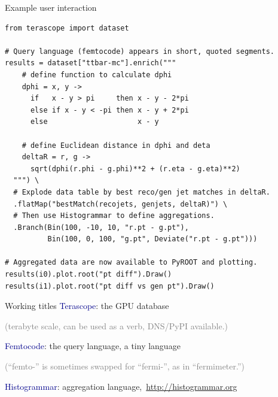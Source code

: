 \documentclass{beamer}
\begin{document}
\begin{frame}[fragile]{Example user interaction}
\vspace{0.25 cm}
\scriptsize
\begin{verbatim}
from terascope import dataset

# Query language (femtocode) appears in short, quoted segments.
results = dataset["ttbar-mc"].enrich("""
    # define function to calculate dphi
    dphi = x, y ->
      if   x - y > pi     then x - y - 2*pi
      else if x - y < -pi then x - y + 2*pi
      else                     x - y

    # define Euclidean distance in dphi and deta
    deltaR = r, g ->
      sqrt(dphi(r.phi - g.phi)**2 + (r.eta - g.eta)**2)
  """) \
  # Explode data table by best reco/gen jet matches in deltaR.
  .flatMap("bestMatch(recojets, genjets, deltaR)") \
  # Then use Histogrammar to define aggregations.
  .Branch(Bin(100, -10, 10, "r.pt - g.pt"),
          Bin(100, 0, 100, "g.pt", Deviate("r.pt - g.pt")))

# Aggregated data are now available to PyROOT and plotting.
results(i0).plot.root("pt diff").Draw()
results(i1).plot.root("pt diff vs gen pt").Draw()
\end{verbatim}
\end{frame}

\begin{frame}{Working titles}
\textcolor{darkblue}{Terascope}: the GPU database

\textcolor{gray}{(terabyte scale, can be used as a verb, DNS/PyPI available.)}

\vspace{0.5 cm}
\textcolor{darkblue}{Femtocode}: the query language, a tiny language

\vspace{0.1 cm}
\textcolor{gray}{(``femto-'' is sometimes swapped for ``fermi-'', as in ``fermimeter.'')}

\vspace{0.5 cm}
\textcolor{darkblue}{Histogrammar}: aggregation \mbox{language, \small \textcolor{blue}{\url{http://histogrammar.org}}\hspace{-2 cm}}
\end{frame}
\end{document}
